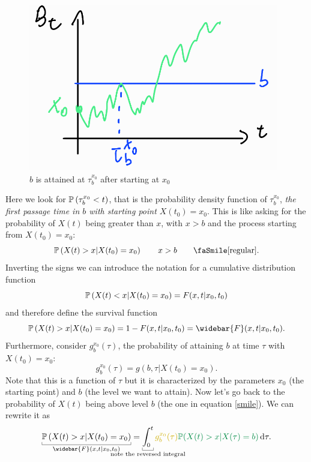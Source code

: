 \documentclass[12pt]{report}
\begin{document}
\begin{figure}[h]
	\centering
	\includegraphics[width=0.5\linewidth]{img/screenshot025}
	\caption{$b$ is attained at $\tau_{b}^{x_0}$ after starting at $x_0$}
	\label{fig:screenshot025}
\end{figure}
Here we look for $\mathbb{P}\left(\tau_{b}^{x_{0}}<t\right)$, that is the probability density function of $\tau_{b}^{x_{0}}$, \textit{the first passage time in $b$ with starting point $X(t_{0})=x_{0}$}.
This is like asking for the probability of $X(t)$ being greater than $x$, with $x>b$ and the process starting from $X(t_{0})=x_{0}$:
\begin{equation*}
	\pr\left(X(t)>x|X(t_{0})=x_{0}\right)\qquad x>b\tag*{\faSmile[regular]}\label{smile}.
\end{equation*}
Inverting the signs we can introduce the notation for a cumulative distribution function
\begin{equation*}
	\mathbb{P}\left(X({t})<x|X(t_{0})=x_{0}\right)=F(x,t|x_{0},t_{0})
\end{equation*}
and therefore define the survival function
\begin{equation*}
		\pr\left(X(t)>x|X(t_{0})=x_{0}\right)=1-F(x,t|x_{0},t_{0})=\widebar{F}(x,t|x_{0},t_{0}).
\end{equation*}
Furthermore, consider $g_{b}^{x_{0}}(\tau)$, the probability of attaining $b$ at time $\tau$ with $X(t_0)=x_{0}$:
\begin{equation*}
	g_{b}^{x_{0}}(\tau)=g(b,\tau|X(t_{0})=x_{0}).
\end{equation*}
Note that this is a function of $\tau$ but it is characterized by the parameters $x_0$ (the starting point) and $b$ (the level we want to attain).
Now let's go back to the probability of $X(t)$ being above level $b$ (the one in equation \ref{smile}). We can rewrite it as
\begin{equation*}
	\ubracketthin{\pr\left(X({t})>x|X(t_{0})=x_{0}\right)}_{\widebar{F}(x,t|x_{0},t_{0})}=\ubracketthin{\int_{0}^{t}}_{\claptext{note the reversed integral}}\mathcolor{Gold3}{g_{b}^{x_{0}}(\tau)}\mathcolor{SpringGreen4}{\pr(X(t)>x|X(\tau)=b)}\dif\tau.
\end{equation*}
\end{document}
